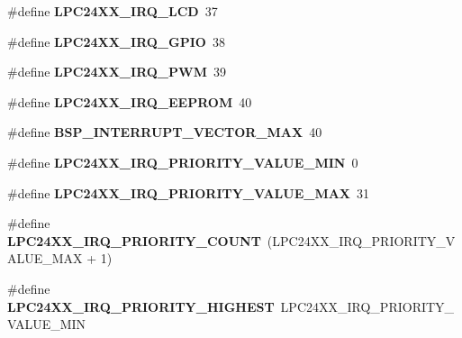 \begin{DoxyCompactItemize}
\#define {\bfseries L\+P\+C24\+X\+X\+\_\+\+I\+R\+Q\+\_\+\+L\+CD}~37
\item 
\mbox{\label{group__bsp__interrupt_ga0102a5dc5d8a82ecd5c3baa2443013ca}} 
\#define {\bfseries L\+P\+C24\+X\+X\+\_\+\+I\+R\+Q\+\_\+\+G\+P\+IO}~38
\item 
\mbox{\label{group__bsp__interrupt_gaa60f73578a13a3741efa54486cb3ef8a}} 
\#define {\bfseries L\+P\+C24\+X\+X\+\_\+\+I\+R\+Q\+\_\+\+P\+WM}~39
\item 
\mbox{\label{group__bsp__interrupt_ga751643521580c8c1ef49a8f5cf708d51}} 
\#define {\bfseries L\+P\+C24\+X\+X\+\_\+\+I\+R\+Q\+\_\+\+E\+E\+P\+R\+OM}~40
\item 
\mbox{\label{group__bsp__interrupt_gae4a2cdda5816a4c83c2fac0a49880c6e}} 
\#define {\bfseries B\+S\+P\+\_\+\+I\+N\+T\+E\+R\+R\+U\+P\+T\+\_\+\+V\+E\+C\+T\+O\+R\+\_\+\+M\+AX}~40
\item 
\mbox{\label{group__bsp__interrupt_gaf16e12c009aafd4ca77709acfc01f397}} 
\#define {\bfseries L\+P\+C24\+X\+X\+\_\+\+I\+R\+Q\+\_\+\+P\+R\+I\+O\+R\+I\+T\+Y\+\_\+\+V\+A\+L\+U\+E\+\_\+\+M\+IN}~0
\item 
\mbox{\label{group__bsp__interrupt_gab24b7228e226ec48aea0bc6e2a2051cf}} 
\#define {\bfseries L\+P\+C24\+X\+X\+\_\+\+I\+R\+Q\+\_\+\+P\+R\+I\+O\+R\+I\+T\+Y\+\_\+\+V\+A\+L\+U\+E\+\_\+\+M\+AX}~31
\item 
\mbox{\label{group__bsp__interrupt_ga454450c0c011a4d52583479bf73b8386}} 
\#define {\bfseries L\+P\+C24\+X\+X\+\_\+\+I\+R\+Q\+\_\+\+P\+R\+I\+O\+R\+I\+T\+Y\+\_\+\+C\+O\+U\+NT}~(L\+P\+C24\+X\+X\+\_\+\+I\+R\+Q\+\_\+\+P\+R\+I\+O\+R\+I\+T\+Y\+\_\+\+V\+A\+L\+U\+E\+\_\+\+M\+AX + 1)
\item 
\mbox{\label{group__bsp__interrupt_ga2fdde1cb1fddfa899d380b3631457f64}} 
\#define {\bfseries L\+P\+C24\+X\+X\+\_\+\+I\+R\+Q\+\_\+\+P\+R\+I\+O\+R\+I\+T\+Y\+\_\+\+H\+I\+G\+H\+E\+ST}~L\+P\+C24\+X\+X\+\_\+\+I\+R\+Q\+\_\+\+P\+R\+I\+O\+R\+I\+T\+Y\+\_\+\+V\+A\+L\+U\+E\+\_\+\+M\+IN
\item 
\mbox{\label{group__bsp__interrupt_gac586cf306bc0bce81175b25dd343ef24}} 

\end{DoxyCompactItemize}
